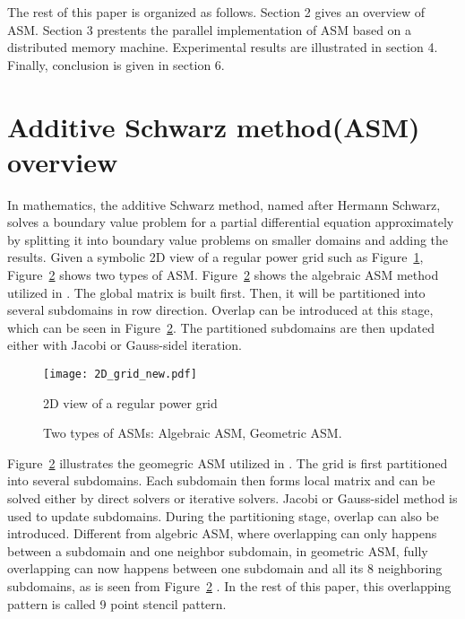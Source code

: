 \documentclass{sig-alternate}
\begin{document}
	The rest of this paper is organized as follows. Section 2 gives an overview of ASM. Section 3 prestents 
	the parallel implementation of ASM based on a distributed memory machine. Experimental results are illustrated in section 4. 
	Finally, conclusion is given in section 6.

\section{Additive Schwarz method(ASM) overview}	
	In mathematics, the additive Schwarz method, named after Hermann Schwarz, solves a boundary value problem for a partial 
	differential equation approximately by splitting it into boundary value problems on smaller domains and adding the results.
	Given a symbolic 2D view of a regular power grid such as Figure~\ref{Fig1}, Figure~\ref{Fig2} shows two types of ASM. 
	Figure~\ref{Fig2} shows the algebraic ASM method utilized in \cite{kaisun}. The global matrix is built first. 
	Then, it will be partitioned into several subdomains in row direction. 
	Overlap can be introduced at this stage, which can be seen in Figure~\ref{Fig2}. The partitioned subdomains
	are then updated either with Jacobi or Gauss-sidel iteration.\\
	\begin{figure}[htbp]
	  \centering
	  \texttt{[image: 2D\_grid\_new.pdf]}
	  \caption{2D view of a regular power grid}
	  \label{Fig1}
	\end{figure}
	
	\begin{figure}[htbp]
	  \caption{Two types of ASMs: 
	   Algebraic ASM,
	   Geometric ASM.}
	  \label{Fig2}
	\end{figure}

	Figure~\ref{Fig2} illustrates the geomegric ASM utilized in \cite{Zhongyu}. The grid is first partitioned
	into several subdomains. Each subdomain then forms local matrix and can be solved either by direct solvers or iterative solvers. 
	Jacobi or Gauss-sidel method is used to update subdomains. During the partitioning stage, overlap can also be introduced.
	Different from algebric ASM, where overlapping can only happens between a subdomain and one neighbor subdomain, in geometric ASM, 
	fully overlapping can now happens between one subdomain and all its 8 neighboring subdomains, as is seen from Figure~\ref{Fig2}
	. In the rest of this paper, this overlapping pattern is called 9 point stencil pattern.\\
	
\end{document}
